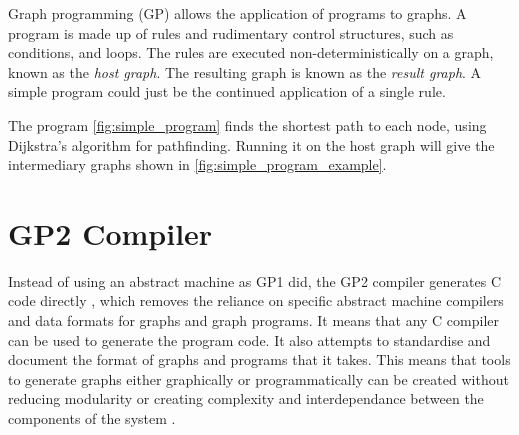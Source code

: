 \documentclass{UoYCSproject}
\begin{document}
Graph programming (GP) allows the application of programs to graphs. A program is made up of rules and rudimentary control structures, such as conditions, and loops. The rules are executed non-deterministically on a graph, known as the \emph{host graph}. The resulting graph is known as the \emph{result graph}. A simple program could just be the continued application of a single rule.






The program \ref{fig:simple_program} finds the shortest path to each node, using Dijkstra's algorithm for pathfinding. Running it on the host graph will give the intermediary graphs shown in \ref{fig:simple_program_example}.



\section{GP2 Compiler}
Instead of using an abstract machine as GP1 did, the GP2 compiler generates C code directly \cite{chris_compiler}, which removes the reliance on specific abstract machine compilers and data formats for graphs and graph programs. It means that any C compiler can be used to generate the program code. It also attempts to standardise and document the format of graphs and programs that it takes. This means that tools to generate graphs either graphically or programmatically can be created without reducing modularity or creating complexity and interdependance between the components of the system \cite{gp2_ide}.
\end{document}
